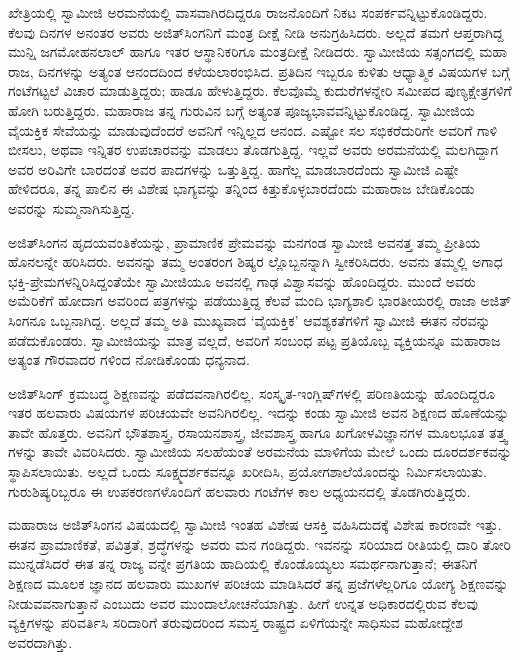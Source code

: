 ಖೇತ್ರಿಯಲ್ಲಿ ಸ್ವಾಮೀಜಿ ಅರಮನೆಯಲ್ಲಿ ವಾಸವಾಗಿರದಿದ್ದರೂ ರಾಜನೊಂದಿಗೆ ನಿಕಟ ಸಂಪರ್ಕವನ್ನಿಟ್ಟುಕೊಂಡಿದ್ದರು. ಕೆಲವು ದಿನಗಳ ಅನಂತರ ಅವರು ಅಜಿತ್​ಸಿಂಗನಿಗೆ ಮಂತ್ರ ದೀಕ್ಷೆ ನೀಡಿ ಅನುಗ್ರಹಿಸಿದರು. ಅಲ್ಲದೆ ತಮಗೆ ಆಪ್ತರಾಗಿದ್ದ ಮುನ್ಷಿ ಜಗಮೋಹನಲಾಲ್ ಹಾಗೂ ಇತರ ಆಸ್ಥಾನಿಕರಿಗೂ ಮಂತ್ರದೀಕ್ಷೆ ನೀಡಿದರು. ಸ್ವಾಮೀಜಿಯ ಸತ್ಸಂಗದಲ್ಲಿ ಮಹಾ ರಾಜ, ದಿನಗಳನ್ನು ಅತ್ಯಂತ ಆನಂದದಿಂದ ಕಳೆಯಲಾರಂಭಿಸಿದ. ಪ್ರತಿದಿನ ಇಬ್ಬರೂ ಕುಳಿತು ಆಧ್ಯಾತ್ಮಿಕ ವಿಷಯಗಳ ಬಗ್ಗೆ ಗಂಟೆಗಟ್ಟಲೆ ವಿಚಾರ ಮಾಡುತ್ತಿದ್ದರು; ಹಾಡೂ ಹೇಳುತ್ತಿದ್ದರು. ಕೆಲವೊಮ್ಮೆ ಕುದುರೆಗಳನ್ನೇರಿ ಸಮೀಪದ ಪುಣ್ಯಕ್ಷೇತ್ರಗಳಿಗೆ ಹೋಗಿ ಬರುತ್ತಿದ್ದರು. ಮಹಾರಾಜ ತನ್ನ ಗುರುವಿನ ಬಗ್ಗೆ ಅತ್ಯಂತ ಪೂಜ್ಯಭಾವವನ್ನಿಟ್ಟುಕೊಂಡಿದ್ದ. ಸ್ವಾಮೀಜಿಯ ವೈಯಕ್ತಿಕ ಸೇವೆಯನ್ನು ಮಾಡುವುದೆಂದರೆ ಅವನಿಗೆ ಇನ್ನಿಲ್ಲದ ಆನಂದ. ಎಷ್ಟೋ ಸಲ ಸಭಿಕರೆದುರಿಗೇ ಅವರಿಗೆ ಗಾಳಿ ಬೀಸಲು, ಅಥವಾ ಇನ್ನಿತರ ಉಪಚಾರವನ್ನು ಮಾಡಲು ತೊಡಗುತ್ತಿದ್ದ. ಇಲ್ಲವೆ ಅವರು ಅರಮನೆಯಲ್ಲಿ ಮಲಗಿದ್ದಾಗ ಅವರ ಅರಿವಿಗೇ ಬಾರದಂತೆ ಅವರ ಪಾದಗಳನ್ನು ಒತ್ತುತ್ತಿದ್ದ. ಹಾಗೆಲ್ಲ ಮಾಡಬಾರದೆಂದು ಸ್ವಾಮೀಜಿ ಎಷ್ಟೇ ಹೇಳಿದರೂ, ತನ್ನ ಪಾಲಿನ ಈ ವಿಶೇಷ ಭಾಗ್ಯವನ್ನು ತನ್ನಿಂದ ಕಿತ್ತುಕೊಳ್ಳಬಾರದೆಂದು ಮಹಾರಾಜ ಬೇಡಿಕೊಂಡು ಅವರನ್ನು ಸುಮ್ಮನಾಗಿಸುತ್ತಿದ್ದ.

ಅಜಿತ್​ಸಿಂಗನ ಹೃದಯವಂತಿಕೆಯನ್ನು, ಪ್ರಾಮಾಣಿಕ ಪ್ರೇಮವನ್ನು ಮನಗಂಡ ಸ್ವಾಮೀಜಿ ಅವನತ್ತ ತಮ್ಮ ಪ್ರೀತಿಯ ಹೊನಲನ್ನೇ ಹರಿಸಿದರು. ಅವನನ್ನು ತಮ್ಮ ಅಂತರಂಗ ಶಿಷ್ಯರ ಲ್ಲೊಬ್ಬನನ್ನಾಗಿ ಸ್ವೀಕರಿಸಿದರು. ಅವನು ತಮ್ಮಲ್ಲಿ ಅಗಾಧ ಭಕ್ತಿ-ಪ್ರೇಮಗಳನ್ನಿರಿಸಿದ್ದಂತೆಯೇ ಸ್ವಾಮೀಜಿಯೂ ಅವನಲ್ಲಿ ಗಾಢ ವಿಶ್ವಾಸವನ್ನು ಹೊಂದಿದ್ದರು. ಮುಂದೆ ಅವರು ಅಮೆರಿಕೆಗೆ ಹೋದಾಗ ಅವರಿಂದ ಪತ್ರಗಳನ್ನು ಪಡೆಯುತ್ತಿದ್ದ ಕೆಲವೆ ಮಂದಿ ಭಾಗ್ಯಶಾಲಿ ಭಾರತೀಯರಲ್ಲಿ ರಾಜಾ ಅಜಿತ್​ಸಿಂಗನೂ ಒಬ್ಬನಾಗಿದ್ದ. ಅಲ್ಲದೆ ತಮ್ಮ ಅತಿ ಮುಖ್ಯವಾದ ‘ವೈಯಕ್ತಿಕ’ ಆವಶ್ಯಕತೆಗಳಿಗೆ ಸ್ವಾಮೀಜಿ ಈತನ ನೆರವನ್ನು ಪಡೆದುಕೊಂಡರು. ಸ್ವಾಮೀಜಿಯನ್ನು ಮಾತ್ರ ವಲ್ಲದೆ, ಅವರಿಗೆ ಸಂಬಂಧ ಪಟ್ಟ ಪ್ರತಿಯೊಬ್ಬ ವ್ಯಕ್ತಿಯನ್ನೂ ಮಹಾರಾಜ ಅತ್ಯಂತ ಗೌರವಾದರ ಗಳಿಂದ ನೋಡಿಕೊಂಡು ಧನ್ಯನಾದ.

ಅಜಿತ್​ಸಿಂಗ್ ಕ್ರಮಬದ್ಧ ಶಿಕ್ಷಣವನ್ನು ಪಡೆದವನಾಗಿರಲಿಲ್ಲ. ಸಂಸ್ಕೃತ-ಇಂಗ್ಲಿಷ್​ಗಳಲ್ಲಿ ಪರಿಣತಿಯನ್ನು ಹೊಂದಿದ್ದರೂ ಇತರ ಹಲವಾರು ವಿಷಯಗಳ ಪರಿಚಯವೇ ಅವನಿಗಿರಲಿಲ್ಲ. ಇದನ್ನು ಕಂಡು ಸ್ವಾಮೀಜಿ ಅವನ ಶಿಕ್ಷಣದ ಹೊಣೆಯನ್ನು ತಾವೇ ಹೊತ್ತರು. ಅವನಿಗೆ ಭೌತಶಾಸ್ತ್ರ, ರಸಾಯನಶಾಸ್ತ್ರ, ಜೀವಶಾಸ್ತ್ರ ಹಾಗೂ ಖಗೋಳವಿಜ್ಞಾನಗಳ ಮೂಲಭೂತ ತತ್ತ್ವ ಗಳನ್ನು ತಾವೇ ವಿವರಿಸಿದರು. ಸ್ವಾಮೀಜಿಯ ಸಲಹೆಯಂತೆ ಅರಮನೆಯ ಮಾಳಿಗೆಯ ಮೇಲೆ ಒಂದು ದೂರದರ್ಶಕವನ್ನು ಸ್ಥಾಪಿಸಲಾಯಿತು. ಅಲ್ಲದೆ ಒಂದು ಸೂಕ್ಷ್ಮದರ್ಶಕವನ್ನೂ ಖರೀದಿಸಿ, ಪ್ರಯೋಗಶಾಲೆಯೊಂದನ್ನು ನಿರ್ಮಿಸಲಾಯಿತು. ಗುರುಶಿಷ್ಯರಿಬ್ಬರೂ ಈ ಉಪಕರಣಗಳೊಂದಿಗೆ ಹಲವಾರು ಗಂಟೆಗಳ ಕಾಲ ಅಧ್ಯಯನದಲ್ಲಿ ತೊಡಗಿರುತ್ತಿದ್ದರು.

ಮಹಾರಾಜ ಅಜಿತ್​ಸಿಂಗನ ವಿಷಯದಲ್ಲಿ ಸ್ವಾಮೀಜಿ ಇಂತಹ ವಿಶೇಷ ಆಸಕ್ತಿ ವಹಿಸಿದುದಕ್ಕೆ ವಿಶೇಷ ಕಾರಣವೇ ಇತ್ತು. ಈತನ ಪ್ರಾಮಾಣಿಕತೆ, ಪವಿತ್ರತೆ, ಶ್ರದ್ಧೆಗಳನ್ನು ಅವರು ಮನ ಗಂಡಿದ್ದರು. ಇವನನ್ನು ಸರಿಯಾದ ರೀತಿಯಲ್ಲಿ ದಾರಿ ತೋರಿ ಮುನ್ನಡೆಸಿದರೆ ಈತ ತನ್ನ ರಾಜ್ಯ ವನ್ನೇ ಪ್ರಗತಿಯ ಹಾದಿಯಲ್ಲಿ ಕೊಂಡೊಯ್ಯಲು ಸಮರ್ಥನಾಗುತ್ತಾನೆ; ಈತನಿಗೆ ಶಿಕ್ಷಣದ ಮೂಲಕ ಜ್ಞಾನದ ಹಲವಾರು ಮುಖಗಳ ಪರಿಚಯ ಮಾಡಿಸಿದರೆ ತನ್ನ ಪ್ರಜೆಗಳೆಲ್ಲರಿಗೂ ಯೋಗ್ಯ ಶಿಕ್ಷಣವನ್ನು ನೀಡುವವನಾಗುತ್ತಾನೆ ಎಂಬುದು ಅವರ ಮುಂದಾಲೋಚನೆಯಾಗಿತ್ತು. ಹೀಗೆ ಉನ್ನತ ಅಧಿಕಾರದಲ್ಲಿರುವ ಕೆಲವು ವ್ಯಕ್ತಿಗಳನ್ನು ಪರಿವರ್ತಿಸಿ ಸರಿದಾರಿಗೆ ತರುವುದರಿಂದ ಸಮಸ್ತ ರಾಷ್ಟ್ರದ ಏಳಿಗೆಯನ್ನೇ ಸಾಧಿಸುವ ಮಹೋದ್ದೇಶ ಅವರದಾಗಿತ್ತು.

